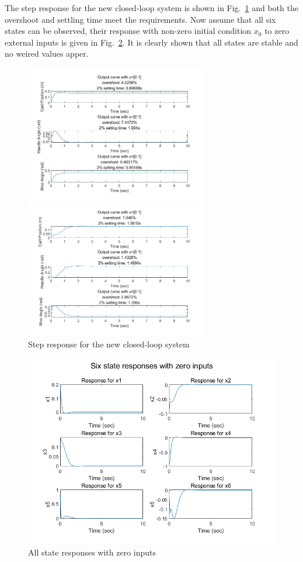 \documentclass[hyperref]{article}
\theoremstyle{nonumberplain}
\begin{document}
	The step response for the new closed-loop system is shown in Fig.~\ref{fig4} and both the overshoot and settling time meet the requirements. Now assume that all six states can be observed, their response with non-zero initial condition $x_{0}$ to zero external inputs is given in Fig.~\ref{fig5}. It is clearly shown that all states are stable and no weired values apper.
	
	\begin{figure}[htbp]
		\centering
		\begin{minipage}[t]{0.48\textwidth}
			\centering
			\includegraphics[width=8cm]{fig5.png}
		\end{minipage}
		\begin{minipage}[t]{0.48\textwidth}
			\centering
			\includegraphics[width=8cm]{fig6.png}
		\end{minipage}
		\caption{Step response for the new closed-loop system}
		\label{fig4}
	\end{figure}

	\begin{figure}[htbp]
		\centering
		\includegraphics[width=0.8\linewidth]{fig7.png}
		\caption{All state responses with zero inputs}
		\label{fig5}
	\end{figure} 
	
\end{document}
